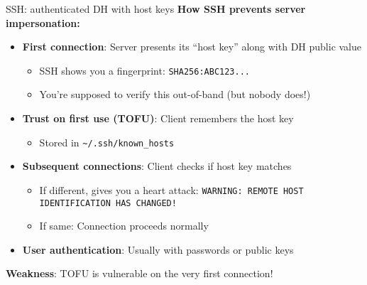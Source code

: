 \documentclass[aspectratio=169, lualatex, handout]{beamer}
\begin{document}
\begin{frame}{SSH: authenticated DH with host keys}
	\textbf{How SSH prevents server impersonation:}
	\begin{itemize}[<+->]
		\item \textbf{First connection}: Server presents its ``host key'' along with DH public value
		      \begin{itemize}
			      \item SSH shows you a fingerprint: \texttt{SHA256:ABC123...}
			      \item You're supposed to verify this out-of-band (but nobody does!)
		      \end{itemize}
		\item \textbf{Trust on first use (TOFU)}: Client remembers the host key
		      \begin{itemize}
			      \item Stored in \texttt{\~{}/.ssh/known\_hosts}
		      \end{itemize}
		\item \textbf{Subsequent connections}: Client checks if host key matches
		      \begin{itemize}
			      \item If different, gives you a heart attack: \texttt{WARNING: REMOTE HOST IDENTIFICATION HAS CHANGED!}
			      \item If same: Connection proceeds normally
		      \end{itemize}
		\item \textbf{User authentication}: Usually with passwords or public keys
	\end{itemize}
	\textbf{Weakness}: TOFU is vulnerable on the very first connection!
\end{frame}
\end{document}

